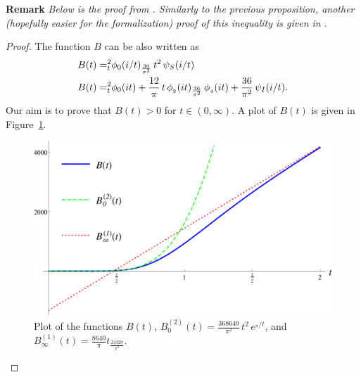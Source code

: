 \noindent\textbf{Remark} \emph{Below is the proof from \cite{Via2017}. Similarly to the previous proposition, another (hopefully easier for the formalization) proof of this inequality is given in \cite{Romik2023}}.
\begin{proof}

The function $B$ can be also written as
\begin{align}
  B(t)=&_t^2\phi_0(i/t)_\frac{36}{\pi^2}\,t^2\,\psi_S(i/t)\notag\\
  B(t)=&_t^2\phi_0(it)+\frac{12}{\pi}\,t\,\phi_{_2}(it)_\frac{36}{\pi^2}\,\phi_{_4}(it)+\frac{36}{\pi^2}\,\psi_I(i/t).\notag
\end{align}
Our aim is to prove that $B(t)>0$ for $t\in(0,\infty)$. A plot of $B(t)$ is given in Figure~\ref{fig:B}.
\begin{figure}[h!]
\caption{Plot of the functions $B(t)$, $B^{(2)}_0(t)=\frac{368640}{\pi^2}\,t^2\,e^{_\pi /t}$, and $B^{(1)}_\infty(t)=\frac{8640}{\pi}t_\frac{23328}{\pi^2}$.\label{fig:B}}
  \centering
\includegraphics[width=300 pt]{graphics/e8plot_B.pdf}
\end{figure}


\end{proof}
